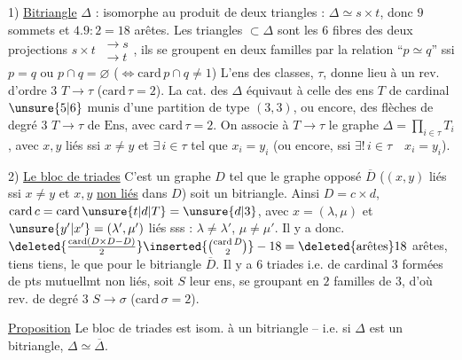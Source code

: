 1) \uline{Bitriangle} $\Delta$ :  isomorphe au  produit de deux triangles : $\Delta\simeq s\times t$,    donc $9$ sommets et $4.9:2=18$ arêtes.
Les triangles $\subset\Delta$ sont les $6$ fibres des deux projections $s\times t\ \substack{\longrightarrow s\\\longrightarrow t}$,  ils se groupent en deux familles par la relation \textquotedblleft$p\simeq q$'' ssi $p=q$ ou $p\cap q=\varnothing$ ($\Longleftrightarrow\mathrm{card}\,p\cap q\ne1$) L'ens des classes, $\tau$, donne lieu à un rev. d'ordre $3$ $T\longrightarrow\tau$ ($\mathrm{card}\,\tau=2$).
La cat. des $\Delta$ équivaut à celle des ens $T$ de cardinal $\unsure{5|6}$ munis d'une partition de type $(3,3)$, ou encore, des flèches de degré $3$ $T\longrightarrow\tau$ de $\mathrm{Ens}$, avec $\mathrm{card}\,\tau=2$. On associe à $T\longrightarrow\tau$ le graphe $\Delta=\prod_{i\in\tau}T_i$, avec  $x,y$ \inserted{$\in\Delta$} liés ssi $x\ne y$ et  $\exists\,i\in\tau$ tel que $x_i=y_i$ (ou encore, ssi $\exists!\,i\in\tau\quad x_i=y_i$).

2) \uline{Le bloc de triades} C'est un graphe  $D$ tel que le graphe opposé $\overline D$ ($(x,y)$ liés  ssi $x\ne y$ et $x,y$ \uline{non liés} dans $D$) soit un bitriangle. Ainsi $D=c\times d$, $\mathrm{card}\,c=\mathrm{card}\,\unsure{t|d|T}=\unsure{d|3}$, avec $x=(\lambda,\mu)$ et $\unsure{y'|x'}=(\lambda',\mu')$ liés sss : $\lambda\ne\lambda'$, $\mu\ne\mu'$. Il y a donc.
$\deleted{\frac{\mathrm{card}(D\times D-D)}{2}}\inserted{\binom{\mathrm{card}\,D}{2}}-18=\deleted{\text{arêtes}}18$ arêtes,  tiens tiens, le  que pour le bitriangle $\overline D$. Il y a $6$ triades i.e.   de cardinal $3$ formées de pts mutuellmt non liés, soit $S$ leur ens, se groupant en $2$ familles de $3$, d'où rev. de degré $3$ $S\to\sigma$ ($\mathrm{card}\,\sigma=2$).

\uline{Proposition} Le bloc de triades est isom. à un bitriangle -- i.e. si $\Delta$  est un bitriangle, $\Delta\simeq\overline\Delta$.


